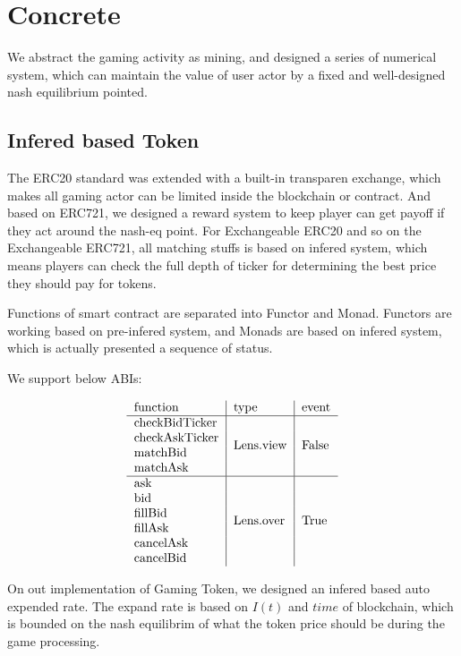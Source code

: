 \documentclass[twocolumn]{article}
\begin{document}
\section {Concrete}

We abstract the gaming activity as mining, and designed a series of numerical system, which can maintain the value of user actor by a fixed and well-designed nash equilibrium pointed.

\subsection {Infered based Token}

The ERC20 standard was extended with a built-in transparen exchange, which makes all gaming actor can be limited inside the blockchain or contract. And based on ERC721, we designed a reward system to keep player can get payoff if they act around the nash-eq point. For Exchangeable ERC20 and so on the Exchangeable ERC721, all matching stuffs is based on infered system, which means players can check the full depth of ticker for determining the best price they should pay for tokens.

Functions of smart contract are separated into Functor and Monad. Functors are working based on pre-infered system, and Monads are based on infered system, which is actually presented a sequence of status.

We support below ABIs:

\begin{gather}
\begin{tabular}{l|l|l}
  function & type & event\\
  \hline
  checkBidTicker & \multirow{4}*{Lens.view} & \multirow{4}*{False} \\
  checkAskTicker& \\
  matchBid & \\
  matchAsk &\\
  \hline
  ask & \multirow{6}*{Lens.over} & \multirow{6}*{True} \\
  bid & \\
  fillBid & \\
  fillAsk &\\
  cancelAsk & \\
  cancelBid & \\
\end{tabular}
\end{gather}

On out implementation of Gaming Token, we designed an infered based auto expended rate. The expand rate is based on $I(t)$ and $time$ of blockchain, which is bounded on the nash equilibrim of what the token price should be during the game processing.
\end{document}
